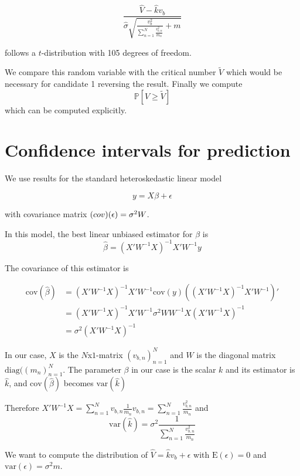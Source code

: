 \documentclass[12pt,a4paper]{article}
\theoremstyle{definition}
\begin{document}
$$\frac{\hat{V}-\hat{k}v_b}{\hat{\sigma}\sqrt{\frac{v_b^2}{\sum_{n=1}^N{\frac{v_{b,n}^2}{m_n}}}+m}}$$


follows a $t$-distribution with 105 degrees of freedom.

We compare this random variable with the critical number $\tilde{V}$ which would be necessary for candidate 1 reversing the result. Finally we compute
\begin{equation*}
\mathbb{P}[V\geq \tilde{V}]
\end{equation*}
which can be computed explicitly.




\section{Confidence intervals for prediction}

We use results for the standard heteroskedastic linear model

$$y=X\beta+\epsilon$$

with covariance matrix $\textrm(cov)(\epsilon)=\sigma^2 W$.

In this model, the best linear unbiased estimator for $\beta$ is
$$\hat{\beta}=(X'W^{-1}X)^{-1}X'W^{-1}y$$

The covariance of this estimator is

\begin{equation*}
\begin{split}
\textrm{cov}(\hat{\beta}) & =(X'W^{-1}X)^{-1}X'W^{-1}\textrm{cov}(y)((X'W^{-1}X)^{-1}X'W^{-1})' \\
& = (X'W^{-1}X)^{-1}X'W^{-1}\sigma^2 W W^{-1}X(X'W^{-1}X)^{-1} \\
& = \sigma^2(X'W^{-1}X)^{-1}
\end{split}
\end{equation*}

In our case, $X$ is the $N$x$1$-matrix $(v_{b,n})_{n=1}^N$ and $W$ is the diagonal matrix
$\textrm{diag}((m_n)_{n=1}^N$. The parameter $\beta$ in our case is the scalar $k$ and its
estimator is $\hat{k}$, and $\textrm{cov}(\hat{\beta})$ becomes $\textrm{var}(\hat{k})$

Therefore $X'W^{-1}X=\sum_{n=1}^N v_{b,n}\frac{1}{m_n}v_{b,n}=\sum_{n=1}^N \frac{v_{b,n}^2}{m_n}$ and
$$ \textrm{var}(\hat{k})=\sigma^2\frac{1}{\sum_{n=1}^N \frac{v_{b,n}^2}{m_n}}$$

We want to compute the distribution of $\hat{V}=\hat{k} v_b + \epsilon$ with $\textrm{E}(\epsilon)=0$ and $\textrm{var}(\epsilon)=\sigma^2 m$.
\end{document}
